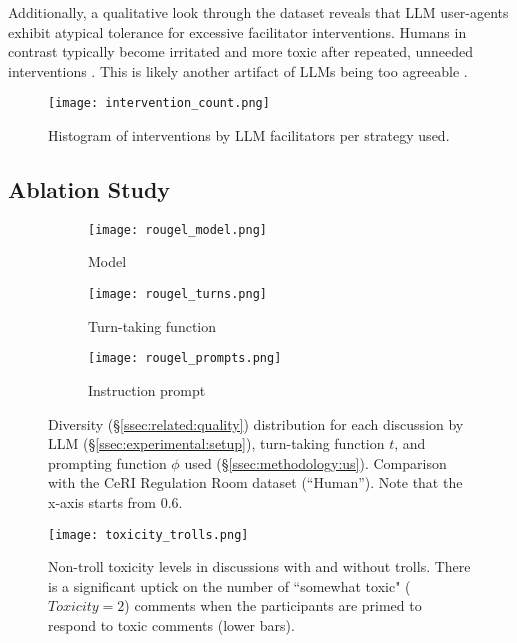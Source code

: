 Additionally, a qualitative look through the dataset reveals that LLM user-agents exhibit atypical tolerance for excessive facilitator interventions. Humans in contrast typically become irritated and more toxic after repeated, unneeded interventions \citep{schaffner_community_guidelines, make_reddit_great, proactive_moderation, cresci_pesonalized_interventions}. This is likely another artifact of LLMs being too agreeable \citep{park2023game, anthis_2025}.

\begin{figure}[t]
	\centering
	\texttt{[image: intervention\_count.png]}
	\caption{Histogram of interventions by LLM facilitators per strategy used.}
	\label{fig:intervention_count}
\end{figure}


\subsection{Ablation Study}
\label{ssec:results:ablation}

\begin{figure*}[t]
    \begin{subfigure}{0.32\linewidth}
        \texttt{[image: rougel\_model.png]}
        \caption{Model}
        \label{fig:rougel_model}
    \end{subfigure}%
    \hfill
    \begin{subfigure}{0.32\linewidth}
        \texttt{[image: rougel\_turns.png]}
        \caption{Turn-taking function}
        \label{fig:rougel_turns}
    \end{subfigure}%
    \hfill
    \begin{subfigure}{0.32\linewidth}
        \texttt{[image: rougel\_prompts.png]}
        \caption{Instruction prompt}
        \label{fig:rougel_prompts}
    \end{subfigure}%

    \caption{Diversity (\S\ref{ssec:related:quality}) distribution for each discussion by LLM (\S\ref{ssec:experimental:setup}), turn-taking function $t$, and prompting function $\phi$ used (\S\ref{ssec:methodology:us}). Comparison with the CeRI Regulation Room dataset (``Human''). Note that the x-axis starts from $0.6$.}
    \label{fig:diversity}
\end{figure*}

\begin{figure}[t]
	\centering
	\texttt{[image: toxicity\_trolls.png]}
	\caption{Non-troll toxicity levels in discussions with and without trolls. There is a significant uptick on the number of ``somewhat toxic" ($Toxicity=2$) comments when the participants are primed to respond to toxic comments (lower bars).}
	\label{fig:toxicity_trolls}
\end{figure}

